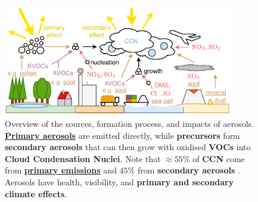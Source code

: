 \begin{figure}[H]
    \centering
    \includegraphics[width=0.9\textwidth]{background/figures/aerosols.pdf}
    \caption[Overview of the sources, formation process, and impacts of aerosols]{Overview of the sources, formation process, and impacts of aerosols. \textcolor{primary-aerosol}{\textbf{\underline{Primary aerosols}}} are emitted directly, while \textcolor{aerosol-precursor}{\textbf{precursors}} form \textbf{secondary aerosols} that can then grow with oxidised \textcolor{aerosol-voc}{\textbf{VOCs}} into \textcolor{aerosol-ccn}{\textbf{Cloud Condensation Nuclei}}. Note that $\approx 55\%$ of \textcolor{aerosol-ccn}{\textbf{CCN}} come from \textcolor{primary-aerosol}{\textbf{\underline{primary emissions}}} and $45\%$ from \textbf{secondary aerosols} \cite{ccn-sources-2009}. Aerosols have health, visibility, and \textcolor{aerosol-climate}{\textbf{primary and secondary climate effects}}.}
    \label{fig:aerosol-emission-effects}
\end{figure}

